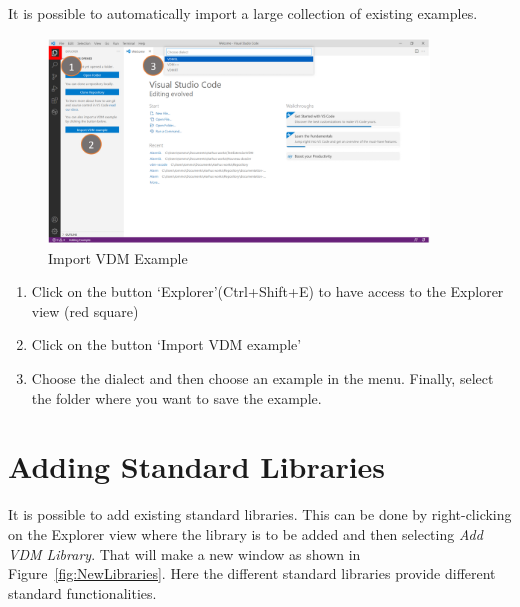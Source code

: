 \documentclass{overturerepchap}
\begin{document}
It is possible to automatically import a large collection of existing examples. 
\begin{figure}[!htb]
	\begin{center}
	  \includegraphics[width=0.9\textwidth]{snapshots/Import VDM example.PNG}
	  \caption[Import existing VDM Examples]{Import VDM Example}
	  \label{fig:example_import}
	\end{center}
\end{figure}

\begin{enumerate}
    \item  Click on the button ‘Explorer’(Ctrl+Shift+E) to have access to the Explorer view (red square)
    \item Click on the button ‘Import VDM example’
    \item Choose the dialect and then choose an example in the menu. Finally, select the folder where you want to save the example. 
\end{enumerate}





\section{Adding Standard Libraries}

It is possible to add existing
standard libraries. This can be done by right-clicking on the Explorer view
where the library is to be added and then selecting 
    \emph{Add VDM Library}. That will make a new window as shown in
    Figure~\ref{fig:NewLibraries}. Here the different standard
    libraries provide different standard functionalities.
\end{document}
